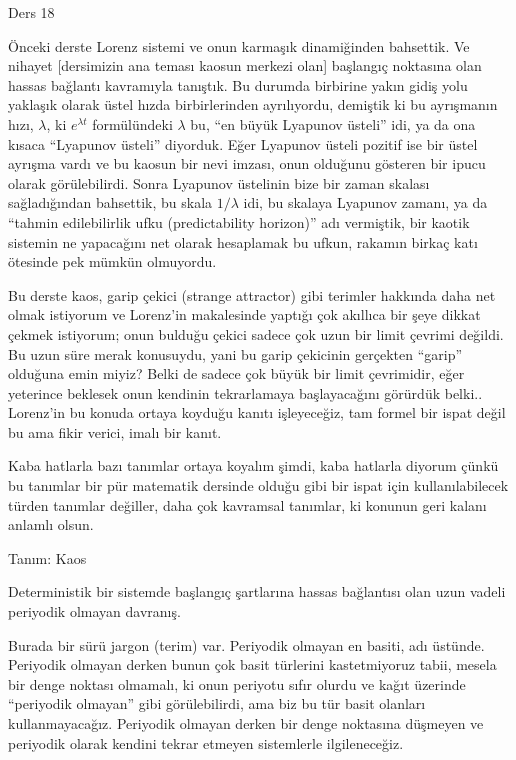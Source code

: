 \documentclass[12pt,fleqn]{article}\usepackage{../../common}
\begin{document}
Ders 18

Önceki derste Lorenz sistemi ve onun karmaşık dinamiğinden bahsettik. Ve
nihayet [dersimizin ana teması kaosun merkezi olan] başlangıç noktasına
olan hassas bağlantı kavramıyla tanıştık. Bu durumda birbirine yakın gidiş
yolu yaklaşık olarak üstel hızda birbirlerinden ayrılıyordu, demiştik ki bu
ayrışmanın hızı, $\lambda$, ki $e^{\lambda t}$ formülündeki $\lambda$ bu,
``en büyük Lyapunov üsteli'' idi, ya da ona kısaca ``Lyapunov üsteli''
diyorduk. Eğer Lyapunov üsteli pozitif ise bir üstel ayrışma vardı ve bu
kaosun bir nevi imzası, onun olduğunu gösteren bir ipucu olarak
görülebilirdi. Sonra Lyapunov üstelinin bize bir zaman skalası
sağladığından bahsettik, bu skala $1/\lambda$ idi, bu skalaya Lyapunov
zamanı, ya da ``tahmin edilebilirlik ufku (predictability horizon)'' adı
vermiştik, bir kaotik sistemin ne yapacağını net olarak hesaplamak bu
ufkun, rakamın birkaç katı ötesinde pek mümkün olmuyordu.

Bu derste kaos, garip çekici (strange attractor) gibi terimler hakkında
daha net olmak istiyorum ve Lorenz'in makalesinde yaptığı çok akıllıca bir
şeye dikkat çekmek istiyorum; onun bulduğu çekici sadece çok uzun bir limit
çevrimi değildi. Bu uzun süre merak konusuydu, yani bu garip çekicinin
gerçekten ``garip'' olduğuna emin miyiz? Belki de sadece çok büyük bir
limit çevrimidir, eğer yeterince beklesek onun kendinin tekrarlamaya
başlayacağını görürdük belki.. Lorenz'in bu konuda ortaya koyduğu kanıtı
işleyeceğiz, tam formel bir ispat değil bu ama fikir verici, imalı bir
kanıt.

Kaba hatlarla bazı tanımlar ortaya koyalım şimdi, kaba hatlarla diyorum
çünkü bu tanımlar bir pür matematik dersinde olduğu gibi bir ispat için
kullanılabilecek türden tanımlar değiller, daha çok kavramsal tanımlar, ki
konunun geri kalanı anlamlı olsun.

Tanım: Kaos

Deterministik bir sistemde başlangıç şartlarına hassas bağlantısı olan uzun
vadeli periyodik olmayan davranış.

Burada bir sürü jargon (terim) var. Periyodik olmayan en basiti, adı
üstünde. Periyodik olmayan derken bunun çok basit türlerini kastetmiyoruz
tabii, mesela bir denge noktası olmamalı, ki onun periyotu sıfır olurdu ve
kağıt üzerinde ``periyodik olmayan'' gibi görülebilirdi, ama biz bu tür
basit olanları kullanmayacağız. Periyodik olmayan derken bir denge
noktasına düşmeyen ve periyodik olarak kendini tekrar etmeyen sistemlerle
ilgileneceğiz.
\end{document}
